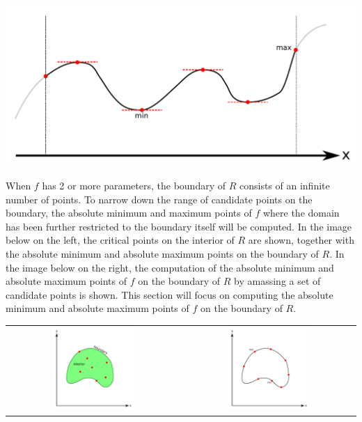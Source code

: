 \documentclass{article}
\begin{document}
\begin{center}
\includegraphics[width = \textwidth]{1_variable_constrained_optimization}
\end{center}

When \(f\) has 2 or more parameters, the boundary of \(R\) consists of an infinite number of points. To narrow down the range of candidate points on the boundary, the absolute minimum and maximum points of \(f\) where the domain has been further restricted to the boundary itself will be computed. In the image below on the left, the critical points on the interior of \(R\) are shown, together with the absolute minimum and absolute maximum points on the boundary of \(R\). In the image below on the right, the computation of the absolute minimum and absolute maximum points of \(f\) on the boundary of \(R\) by amassing a set of candidate points is shown. This section will focus on computing the absolute minimum and absolute maximum points of \(f\) on the boundary of \(R\). 

\begin{center}
\begin{tabular}{cc}
\includegraphics[width = 0.5\textwidth]{2_variable_constrained_optimization} & 
\includegraphics[width = 0.5\textwidth]{2_variable_constrained_optimization_boundary}
\end{tabular}
\end{center}
\end{document}
